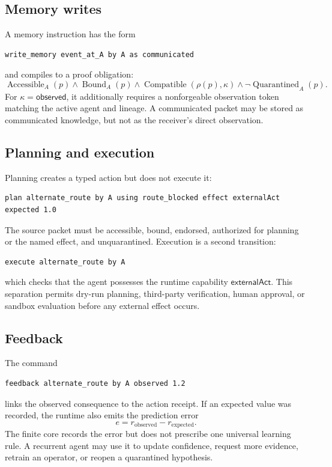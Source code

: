 \subsection{Memory writes}

A memory instruction has the form
\begin{lstlisting}[style=osl]
write_memory event_at_A by A as communicated
\end{lstlisting}
and compiles to a proof obligation:
\[
\operatorname{Accessible}_A(p)
\wedge
\operatorname{Bound}_A(p)
\wedge
\operatorname{Compatible}(\rho(p),\kappa)
\wedge
\neg\operatorname{Quarantined}_A(p).
\]
For \(\kappa=\mathsf{observed}\), it additionally requires a nonforgeable
observation token matching the active agent and lineage.  A communicated packet
may be stored as communicated knowledge, but not as the receiver's direct
observation.

\subsection{Planning and execution}

Planning creates a typed action but does not execute it:
\begin{lstlisting}[style=osl]
plan alternate_route by A using route_blocked effect externalAct expected 1.0
\end{lstlisting}
The source packet must be accessible, bound, endorsed, authorized for planning
or the named effect, and unquarantined.  Execution is a second transition:
\begin{lstlisting}[style=osl]
execute alternate_route by A
\end{lstlisting}
which checks that the agent possesses the runtime capability
\(\mathsf{externalAct}\).  This separation permits dry-run planning,
third-party verification, human approval, or sandbox evaluation before any
external effect occurs.

\subsection{Feedback}

The command
\begin{lstlisting}[style=osl]
feedback alternate_route by A observed 1.2
\end{lstlisting}
links the observed consequence to the action receipt.  If an expected value was
recorded, the runtime also emits the prediction error
\[
e=r_{\mathrm{observed}}-r_{\mathrm{expected}}.
\]
The finite core records the error but does not prescribe one universal learning
rule.  A recurrent agent may use it to update confidence, request more evidence,
retrain an operator, or reopen a quarantined hypothesis.


